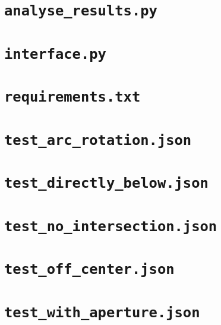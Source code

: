 \section{\texttt{analyse\_results.py}}


\section{\texttt{interface.py}}


\section{\texttt{requirements.txt}}


\section{\texttt{test\_arc\_rotation.json}}


\section{\texttt{test\_directly\_below.json}}


\section{\texttt{test\_no\_intersection.json}}


\section{\texttt{test\_off\_center.json}}


\section{\texttt{test\_with\_aperture.json}}


